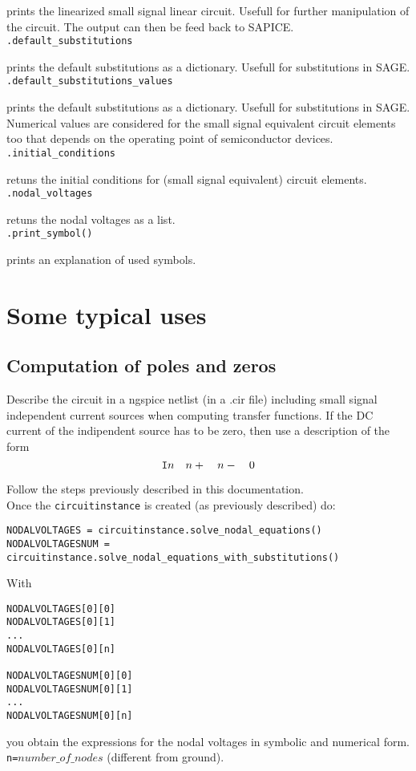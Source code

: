 \documentclass[a4paper]{article}
\begin{document}
prints the linearized small signal linear circuit. Usefull for further manipulation of the circuit. The output can then be feed back to SAPICE.\\

{\tt .default\_substitutions}

prints the default substitutions as a dictionary. Usefull for substitutions in SAGE.\\

{\tt .default\_substitutions\_values}

prints the default substitutions as a dictionary. Usefull for substitutions in SAGE. Numerical values are considered for the small signal equivalent circuit elements too that depends on the operating point of semiconductor devices.\\

{\tt .initial\_conditions}

retuns the initial conditions for (small signal equivalent) circuit elements.\\

{\tt .nodal\_voltages}

retuns the nodal voltages as a list.\\

{\tt .print\_symbol()}

prints an explanation of used symbols.

\section{Some typical uses}
\subsection{Computation of poles and zeros}

Describe the circuit in a ngspice netlist (in a .cir file) including small signal independent current sources when computing transfer functions. If the DC current of the indipendent source has to be zero, then use a description of the form
\begin{displaymath}
{\tt I}n\quad n+\quad n-\quad 0
\end{displaymath}

Follow the steps previously described in this documentation.\\

Once the {\tt circuitinstance} is created (as previously described) do:
\begin{verbatim}
NODALVOLTAGES = circuitinstance.solve_nodal_equations()
NODALVOLTAGESNUM = circuitinstance.solve_nodal_equations_with_substitutions()
\end{verbatim}
With
\begin{verbatim}
NODALVOLTAGES[0][0]
NODALVOLTAGES[0][1]
...
NODALVOLTAGES[0][n]

NODALVOLTAGESNUM[0][0]
NODALVOLTAGESNUM[0][1]
...
NODALVOLTAGESNUM[0][n]
\end{verbatim}
you obtain the expressions for the nodal voltages in symbolic and numerical form. {\tt n=}$number\_of\_nodes$ (different from ground).\\
\end{document}
